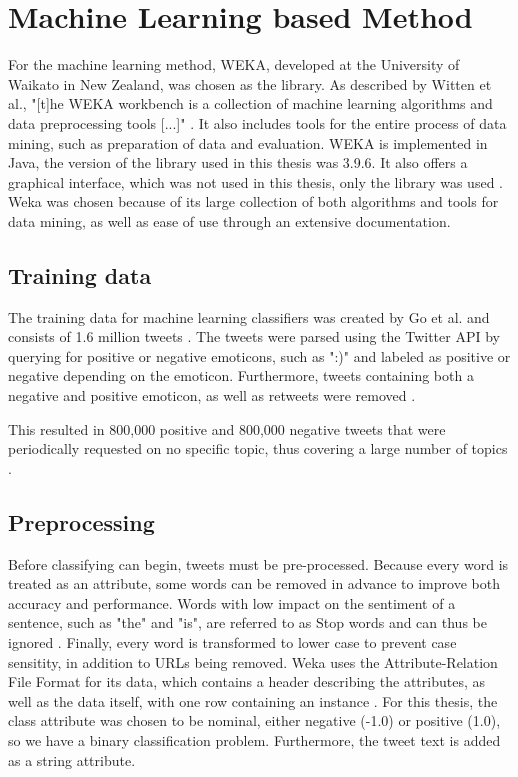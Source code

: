 \section{Machine Learning based Method}

For the machine learning method, WEKA, developed at the University of Waikato in New Zealand, was chosen as the library. As described by Witten et al., "[t]he WEKA workbench is a collection of machine learning algorithms and data preprocessing tools [...]" \cite[p.~7]{weka}. It also includes tools for the entire process of data mining, such as preparation of data and evaluation. WEKA is implemented in Java, the version of the library used in this thesis was 3.9.6. It also offers a graphical interface, which was not used in this thesis, only the library was used \cite{weka}. Weka was chosen because of its large collection of both algorithms and tools for data mining, as well as ease of use through an extensive documentation.

\subsection{Training data}
The training data for machine learning classifiers was created by Go et al. and consists of 1.6 million tweets \cite{GoBHaHua2009}. The tweets were parsed using the Twitter API by querying for positive or negative emoticons, such as ":)" and labeled as positive or negative depending on the emoticon. Furthermore, tweets containing both a negative and positive emoticon, as well as retweets were removed \cite{GoBHaHua2009}.

This resulted in 800,000 positive and 800,000 negative tweets that were periodically requested on no specific topic, thus covering a large number of topics \cite{GoBHaHua2009}.

\subsection{Preprocessing}
Before classifying can begin, tweets must be pre-processed. Because every word is treated as an attribute, some words can be removed in advance to improve both accuracy and performance. Words with low impact on the sentiment of a sentence, such as "the" and "is", are referred to as Stop words and can thus be ignored \cite{DBLP:journals/csur/GiachanouC16}. Finally, every word is transformed to lower case to prevent case sensitity, in addition to URLs being removed. Weka uses the Attribute-Relation File Format for its data, which contains a header describing the attributes, as well as the data itself, with one row containing an instance \cite{weka}. For this thesis, the class attribute was chosen to be nominal, either negative (-1.0) or positive (1.0), so we have a binary classification problem. Furthermore, the tweet text is added as a string attribute.

